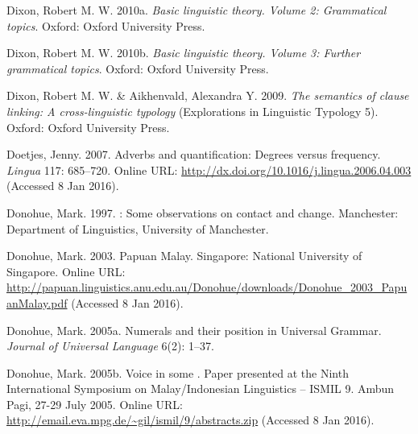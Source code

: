 \begin{styleCitaviBibliographyEntry}
Dixon, Robert M. W. 2010a. \textit{Basic linguistic theory. Volume 2: Grammatical topics}. Oxford: Oxford University Press.
\end{styleCitaviBibliographyEntry}

\begin{styleCitaviBibliographyEntry}
Dixon, Robert M. W. 2010b. \textit{Basic linguistic theory. Volume 3: Further grammatical topics}. Oxford: Oxford University Press.
\end{styleCitaviBibliographyEntry}

\begin{styleCitaviBibliographyEntry}
Dixon, Robert M. W. \& Aikhenvald, Alexandra Y. 2009. \textit{The semantics of clause linking: A cross-linguistic typology} (Explorations in Linguistic Typology 5). Oxford: Oxford University Press.
\end{styleCitaviBibliographyEntry}

\begin{styleCitaviBibliographyEntry}
Doetjes, Jenny. 2007. Adverbs and quantification: Degrees versus frequency. \textit{Lingua} 117: 685–720. Online URL: \url{http://dx.doi.org/10.1016/j.lingua.2006.04.003} (Accessed 8 Jan 2016).
\end{styleCitaviBibliographyEntry}

\begin{styleCitaviBibliographyEntry}
Donohue, Mark. 1997. : Some observations on contact and change. Manchester: Department of Linguistics, University of Manchester.
\end{styleCitaviBibliographyEntry}

\begin{styleCitaviBibliographyEntry}
Donohue, Mark. 2003. Papuan Malay. Singapore: National University of Singapore. Online URL: \url{http://papuan.linguistics.anu.edu.au/Donohue/downloads/Donohue_2003_PapuanMalay.pdf} (Accessed 8 Jan 2016).
\end{styleCitaviBibliographyEntry}

\begin{styleCitaviBibliographyEntry}
Donohue, Mark. 2005a. Numerals and their position in Universal Grammar. \textit{Journal of Universal Language} 6(2): 1–37.
\end{styleCitaviBibliographyEntry}

\begin{styleCitaviBibliographyEntry}
Donohue, Mark. 2005b. Voice in some . Paper presented at the Ninth International Symposium on Malay/Indonesian Linguistics – ISMIL 9. Ambun Pagi, 27-29 July 2005. Online URL: \url{http://email.eva.mpg.de/~gil/ismil/9/abstracts.zip} (Accessed 8 Jan 2016).
\end{styleCitaviBibliographyEntry}

